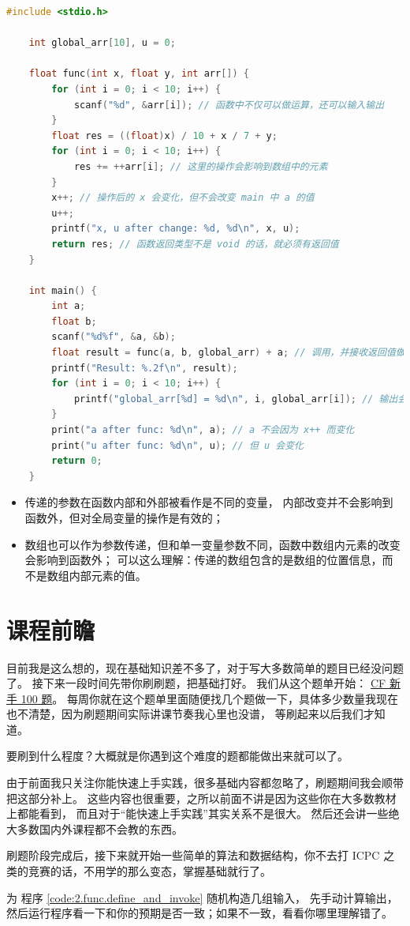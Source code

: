 \documentclass[lang=cn,newtx,10pt,scheme=chinese]{elegantbook}
\begin{document}
\begin{lstlisting}[language=C]
    #include <stdio.h>

    int global_arr[10], u = 0;

    float func(int x, float y, int arr[]) {
        for (int i = 0; i < 10; i++) {
            scanf("%d", &arr[i]); // 函数中不仅可以做运算，还可以输入输出
        }
        float res = ((float)x) / 10 + x / 7 + y; 
        for (int i = 0; i < 10; i++) {
            res += ++arr[i]; // 这里的操作会影响到数组中的元素
        }
        x++; // 操作后的 x 会变化，但不会改变 main 中 a 的值
        u++;
        printf("x, u after change: %d, %d\n", x, u);
        return res; // 函数返回类型不是 void 的话，就必须有返回值
    }

    int main() {
        int a;
        float b;
        scanf("%d%f", &a, &b);
        float result = func(a, b, global_arr) + a; // 调用，并接收返回值做进一步运算
        printf("Result: %.2f\n", result);
        for (int i = 0; i < 10; i++) {
            printf("global_arr[%d] = %d\n", i, global_arr[i]); // 输出会显示数组里的元素都加了 1
        }
        print("a after func: %d\n", a); // a 不会因为 x++ 而变化
        print("u after func: %d\n", u); // 但 u 会变化
        return 0;
    }
\end{lstlisting}

\begin{itemize}
    \item 传递的参数在函数内部和外部被看作是不同的变量，
    内部改变并不会影响到函数外，但对全局变量的操作是有效的；
    \item 数组也可以作为参数传递，但和单一变量参数不同，函数中数组内元素的改变会影响到函数外；
    可以这么理解：传递的数组包含的是数组的位置信息，而不是数组内部元素的值。
\end{itemize}

\section{课程前瞻}

目前我是这么想的，现在基础知识差不多了，对于写大多数简单的题目已经没问题了。
接下来一段时间先带你刷刷题，把基础打好。
我们从这个题单开始：
\href{https://github.com/ankitvashisht12/100-questions-of-codeforces}{CF 新手 100 题}。
每周你就在这个题单里面随便找几个题做一下，具体多少数量我现在也不清楚，因为刷题期间实际讲课节奏我心里也没谱，
等刷起来以后我们才知道。

要刷到什么程度？大概就是你遇到这个难度的题都能做出来就可以了。

由于前面我只关注你能快速上手实践，很多基础内容都忽略了，刷题期间我会顺带把这部分补上。
这些内容也很重要，之所以前面不讲是因为这些你在大多数教材上都能看到，
而且对于“能快速上手实践”其实关系不是很大。
然后还会讲一些绝大多数国内外课程都不会教的东西。

刷题阶段完成后，接下来就开始一些简单的算法和数据结构，你不去打 ICPC 之类的竞赛的话，不用学的那么变态，掌握基础就行了。

\begin{problemset}[练习]
    \item 为 程序 \ref{code:2.func.define_and_invoke} 随机构造几组输入，
    先手动计算输出，然后运行程序看一下和你的预期是否一致；如果不一致，看看你哪里理解错了。
\end{problemset}
\end{document}
